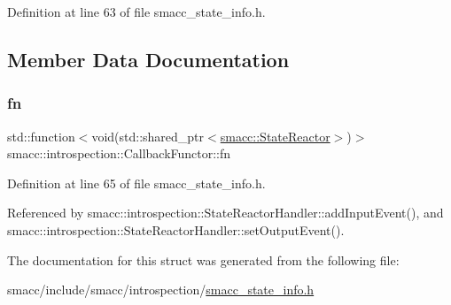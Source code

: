 Definition at line 63 of file smacc\+\_\+state\+\_\+info.\+h.



\subsection{Member Data Documentation}
\mbox{\label{structsmacc_1_1introspection_1_1CallbackFunctor_a459e9ea2fb050739b927c4722c843e51}} 
\subsubsection{\texorpdfstring{fn}{fn}}
{\footnotesize\ttfamily std\+::function$<$void(std\+::shared\+\_\+ptr$<$\hyperlink{classsmacc_1_1StateReactor}{smacc\+::\+State\+Reactor}$>$)$>$ smacc\+::introspection\+::\+Callback\+Functor\+::fn}



Definition at line 65 of file smacc\+\_\+state\+\_\+info.\+h.



Referenced by smacc\+::introspection\+::\+State\+Reactor\+Handler\+::add\+Input\+Event(), and smacc\+::introspection\+::\+State\+Reactor\+Handler\+::set\+Output\+Event().



The documentation for this struct was generated from the following file\+:\begin{DoxyCompactItemize}
\item 
smacc/include/smacc/introspection/\hyperlink{smacc__state__info_8h}{smacc\+\_\+state\+\_\+info.\+h}\end{DoxyCompactItemize}
